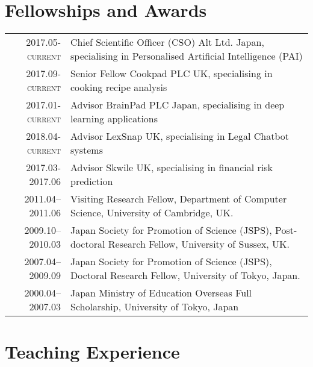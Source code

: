 \documentclass[a4paper,11pt]{article}
\begin{document}
\section{Fellowships and Awards}
\begin{tabular}{r p{11cm}}
\textsc{2017.05-current} & Chief Scientific Officer (CSO) Alt Ltd. Japan, specialising in Personalised Artificial Intelligence (PAI)\\
\textsc{2017.09-current} & Senior Fellow Cookpad PLC  UK, specialising in cooking recipe analysis\\
\textsc{2017.01-current} & Advisor BrainPad PLC Japan, specialising in deep learning applications \\
\textsc{2018.04-current} & Advisor LexSnap UK, specialising in Legal Chatbot systems\\
\textsc{2017.03-2017.06} & Advisor Skwile UK, specialising in financial risk prediction \\
\textsc{2011.04--2011.06} & Visiting Research Fellow, Department of Computer Science, University of Cambridge, UK. \\
\textsc{2009.10--2010.03} & Japan Society for Promotion of Science (JSPS), Post-doctoral Research Fellow, University of Sussex, UK. \\
\textsc{2007.04--2009.09} & Japan Society for Promotion of Science (JSPS), Doctoral Research Fellow, University of Tokyo, Japan.\\
\textsc{2000.04--2007.03} & Japan Ministry of Education Overseas Full Scholarship, University of Tokyo, Japan
\end{tabular}


\section{Teaching Experience}
\end{document}
